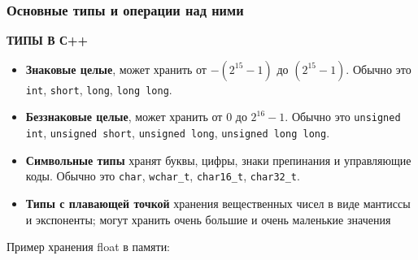 \subsubsection{Основные типы и операции над ними}
\textbf{ТИПЫ В С++}
\begin{itemize}
  \item \textbf{Знаковые целые}, может хранить от $-(2^{15} -1)$ до $(2^{15} -1).$ Обычно это \texttt{int}, \texttt{short}, \texttt{long}, \texttt{long long}.
  \item \textbf{Беззнаковые целые}, может хранить от $0$ до $2^{16} -1.$ Обычно это \texttt{unsigned int}, \texttt{unsigned short}, \texttt{unsigned long}, \texttt{unsigned long long}.
  \item \textbf{Символьные типы} хранят буквы, цифры, знаки препинания и управляющие коды. Обычно это \texttt{char}, \texttt{wchar\_t}, \texttt{char16\_t}, \texttt{char32\_t}.
  \item \textbf{Типы с плавающей точкой} хранения вещественных чисел в виде мантиссы и экспоненты; могут хранить очень большие и очень маленькие значения
\end{itemize}
Пример хранения float в памяти:
\usetikzlibrary{chains, decorations.pathreplacing}
